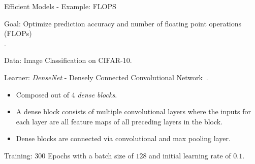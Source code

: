 \begin{frame}{Efficient Models - Example: FLOPS}

    Goal: Optimize prediction accuracy and number of floating point operations (FLOPs)~\\ .

    \vspace{0.5cm}

    Data: Image Classification on CIFAR-10.

    \vspace{0.5cm}

    Learner: \emph{DenseNet} - Densely Connected Convolutional Network~.

    \begin{itemize}
        \item Composed out of $4$ \emph{dense blocks}.
        \item A dense block consists of multiple convolutional layers where the inputs for each layer are all feature maps of all preceding layers in the block.
        \item Dense blocks are connected via convolutional and max pooling layer.
    \end{itemize}

    \vspace{0.5cm}

    Training: $300$ Epochs with a batch size of $128$ and initial learning rate of $0.1$.

\end{frame}

